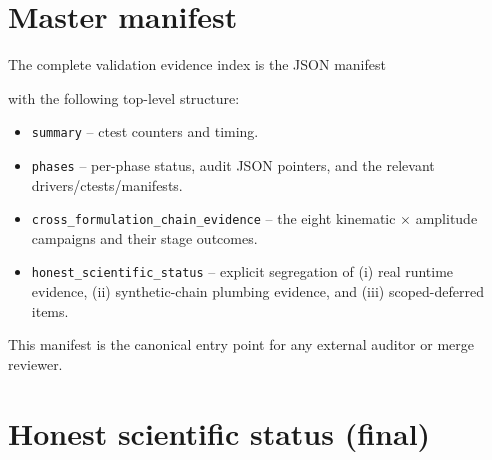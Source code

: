 \section{Master manifest}

The complete validation evidence index is the JSON manifest

\begin{center}
\end{center}

with the following top-level structure:

\begin{itemize}
  \item \texttt{summary} -- ctest counters and timing.
  \item \texttt{phases} -- per-phase status, audit JSON pointers, and
        the relevant drivers/ctests/manifests.
  \item \texttt{cross\_formulation\_chain\_evidence} -- the eight
        kinematic\(\,\times\,\)amplitude campaigns and their stage
        outcomes.
  \item \texttt{honest\_scientific\_status} -- explicit segregation
        of (i) real runtime evidence, (ii) synthetic-chain plumbing
        evidence, and (iii) scoped-deferred items.
\end{itemize}

This manifest is the canonical entry point for any external auditor
or merge reviewer.

\section{Honest scientific status (final)}


